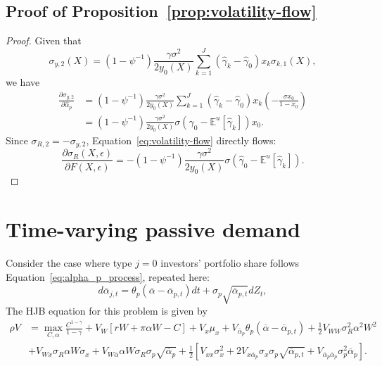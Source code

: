 \subsection{Proof of Proposition~\ref{prop:volatility-flow}}\label{app:prop_volatility-flow}
\begin{proof}
	Given that  
	\[\sigma_{y, 2}(X)=\left(1-\psi^{-1}\right) \frac{\gamma \sigma^{2}}{2 y_{0}(X)} \sum_{k=1}^{J}\left(\hat{\gamma}_{k}-\hat{\gamma}_{0}\right) x_{k} \sigma_{k, 1}(X),\]
	we have 
	\begin{align*}
		\frac{\partial \sigma_{y, 2}}{\partial \hat{\alpha}_{p}}&=\left(1-\psi^{-1}\right) \frac{\gamma \sigma^{2}}{2 y_{0}(X)} \sum_{k=1}^{J}\left(\hat{\gamma}_{k}-\hat{\gamma}_{0}\right) x_{k}\left(-\frac{\sigma x_{0}}{1-x_{0}}\right)\\
		&=\left(1-\psi^{-1}\right) \frac{\gamma \sigma^{2}}{2 y_{0}(X)}\sigma\left(\hat{\gamma}_{0}-\mathbb{E}^{u}\left[\hat{\gamma}_{k}\right]\right) x_{0}.
	\end{align*}
	Since $ \sigma_{R,2}=-\sigma_{y,2} $,  Equation~\eqref{eq:volatility-flow} directly flows:
	\[\frac{\partial \sigma_{R}(X, \epsilon)}{\partial F(X, \epsilon)}=-\left(1-\psi^{-1}\right) \frac{\gamma \sigma^{2}}{2 y_{0}(X)}\sigma\left(\hat{\gamma}_{0}-\mathbb{E}^{u}\left[\hat{\gamma}_{k}\right]\right).\]
\end{proof}

\section{Time-varying passive demand}
Consider the case where type $ j=0 $ investors' portfolio share follows Equation~\eqref{eq:alpha_p_process}, repeated here:
\begin{equation*}
	d \overline{\alpha}_{j,t} = \theta_p ( \overline{\alpha} - \overline{\alpha}_{p,t}) dt + \sigma_p \sqrt{\overline{\alpha}_{p,t}} d Z_t,
\end{equation*}
The HJB equation for this problem is given by
\begin{align*}
	\rho V &=  \max_{C,\alpha}\frac{C^{1-\gamma}}{1-\gamma} + V_W \left[ r W + \pi \alpha W -C  \right] + V_x \mu_x + V_{\overline{\alpha}_p} \theta_p (\overline{\alpha}-\overline{\alpha}_{p,t})+ \frac{1}{2} V_{WW} \sigma_R^2 \alpha^2 W^2 \nonumber\\
	&+ V_{Wx} \sigma_R \alpha W \sigma_x  + V_{W\overline{\alpha}} \alpha W \sigma_R \sigma_p \sqrt{\overline{\alpha}_p}+ \frac{1}{2} \left[V_{xx} \sigma_x^2 + 2 V_{x \overline{\alpha}_p} \sigma_x \sigma_p \sqrt{\overline{\alpha}_{p,t}} + V_{\overline{\alpha}_p\overline{\alpha}_p} \sigma_p^2\overline{\alpha}_p\right].
\end{align*}

